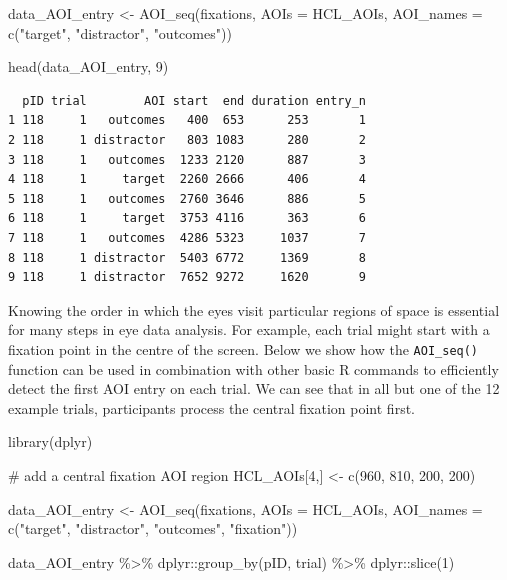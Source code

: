 \documentclass[
  man,
  floatsintext,
  longtable,
  nolmodern,
  notxfonts,
  notimes,
  colorlinks=true,linkcolor=blue,citecolor=blue,urlcolor=blue]{apa7}
\newenvironment{Shaded}{\begin{snugshade}}{\end{snugshade}}
\newcommand{\AttributeTok}[1]{\textcolor[rgb]{0.40,0.45,0.13}{#1}}
\newcommand{\CommentTok}[1]{\textcolor[rgb]{0.37,0.37,0.37}{#1}}
\newcommand{\DecValTok}[1]{\textcolor[rgb]{0.68,0.00,0.00}{#1}}
\newcommand{\FunctionTok}[1]{\textcolor[rgb]{0.28,0.35,0.67}{#1}}
\newcommand{\NormalTok}[1]{\textcolor[rgb]{0.00,0.23,0.31}{#1}}
\newcommand{\OtherTok}[1]{\textcolor[rgb]{0.00,0.23,0.31}{#1}}
\newcommand{\SpecialCharTok}[1]{\textcolor[rgb]{0.37,0.37,0.37}{#1}}
\newcommand{\StringTok}[1]{\textcolor[rgb]{0.13,0.47,0.30}{#1}}
\begin{document}
\begin{Shaded}
\begin{Highlighting}[]
\NormalTok{data\_AOI\_entry }\OtherTok{\textless{}{-}} 
  \FunctionTok{AOI\_seq}\NormalTok{(fixations, }
          \AttributeTok{AOIs =}\NormalTok{ HCL\_AOIs,}
          \AttributeTok{AOI\_names =} \FunctionTok{c}\NormalTok{(}\StringTok{"target"}\NormalTok{, }\StringTok{"distractor"}\NormalTok{, }\StringTok{"outcomes"}\NormalTok{))}

\FunctionTok{head}\NormalTok{(data\_AOI\_entry, }\DecValTok{9}\NormalTok{)}
\end{Highlighting}
\end{Shaded}

\begin{verbatim}
  pID trial        AOI start  end duration entry_n
1 118     1   outcomes   400  653      253       1
2 118     1 distractor   803 1083      280       2
3 118     1   outcomes  1233 2120      887       3
4 118     1     target  2260 2666      406       4
5 118     1   outcomes  2760 3646      886       5
6 118     1     target  3753 4116      363       6
7 118     1   outcomes  4286 5323     1037       7
8 118     1 distractor  5403 6772     1369       8
9 118     1 distractor  7652 9272     1620       9
\end{verbatim}

Knowing the order in which the eyes visit particular regions of space is
essential for many steps in eye data analysis. For example, each trial
might start with a fixation point in the centre of the screen. Below we
show how the \texttt{AOI\_seq()} function can be used in combination
with other basic R commands to efficiently detect the first AOI entry on
each trial. We can see that in all but one of the 12 example trials,
participants process the central fixation point first.

\begin{Shaded}
\begin{Highlighting}[]
\FunctionTok{library}\NormalTok{(dplyr)}

\CommentTok{\# add a central fixation AOI region}
\NormalTok{HCL\_AOIs[}\DecValTok{4}\NormalTok{,] }\OtherTok{\textless{}{-}} \FunctionTok{c}\NormalTok{(}\DecValTok{960}\NormalTok{, }\DecValTok{810}\NormalTok{, }\DecValTok{200}\NormalTok{, }\DecValTok{200}\NormalTok{)}

\NormalTok{data\_AOI\_entry }\OtherTok{\textless{}{-}} 
  \FunctionTok{AOI\_seq}\NormalTok{(fixations, }
          \AttributeTok{AOIs =}\NormalTok{ HCL\_AOIs,}
          \AttributeTok{AOI\_names =} \FunctionTok{c}\NormalTok{(}\StringTok{"target"}\NormalTok{, }\StringTok{"distractor"}\NormalTok{, }\StringTok{"outcomes"}\NormalTok{, }\StringTok{"fixation"}\NormalTok{))}

\NormalTok{data\_AOI\_entry }\SpecialCharTok{\%\textgreater{}\%} 
\NormalTok{  dplyr}\SpecialCharTok{::}\FunctionTok{group\_by}\NormalTok{(pID, trial) }\SpecialCharTok{\%\textgreater{}\%} 
\NormalTok{  dplyr}\SpecialCharTok{::}\FunctionTok{slice}\NormalTok{(}\DecValTok{1}\NormalTok{)}
\end{Highlighting}
\end{Shaded}
\end{document}
